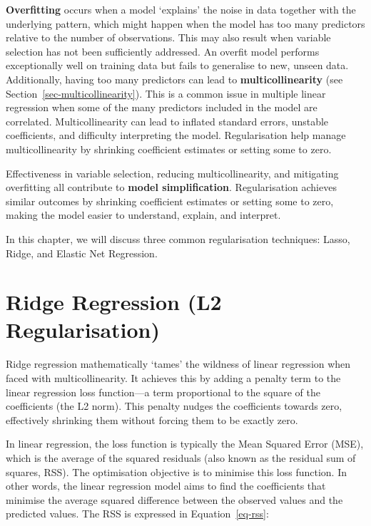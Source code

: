 \documentclass[
  letterpaper,
]{book}
\begin{document}
\textbf{Overfitting} occurs when a model `explains' the noise in data
together with the underlying pattern, which might happen when the model
has too many predictors relative to the number of observations. This may
also result when variable selection has not been sufficiently addressed.
An overfit model performs exceptionally well on training data but fails
to generalise to new, unseen data. Additionally, having too many
predictors can lead to \textbf{multicollinearity} (see
Section~\ref{sec-multicollinearity}). This is a common issue in multiple
linear regression when some of the many predictors included in the model
are correlated. Multicollinearity can lead to inflated standard errors,
unstable coefficients, and difficulty interpreting the model.
Regularisation help manage multicollinearity by shrinking coefficient
estimates or setting some to zero.

Effectiveness in variable selection, reducing multicollinearity, and
mitigating overfitting all contribute to \textbf{model simplification}.
Regularisation achieves similar outcomes by shrinking coefficient
estimates or setting some to zero, making the model easier to
understand, explain, and interpret.

In this chapter, we will discuss three common regularisation techniques:
Lasso, Ridge, and Elastic Net Regression.

\section{Ridge Regression (L2
Regularisation)}\label{ridge-regression-l2-regularisation}

Ridge regression mathematically `tames' the wildness of linear
regression when faced with multicollinearity. It achieves this by adding
a penalty term to the linear regression loss function---a term
proportional to the square of the coefficients (the L2 norm). This
penalty nudges the coefficients towards zero, effectively shrinking them
without forcing them to be exactly zero.

In linear regression, the loss function is typically the Mean Squared
Error (MSE), which is the average of the squared residuals (also known
as the residual sum of squares, RSS). The optimisation objective is to
minimise this loss function. In other words, the linear regression model
aims to find the coefficients that minimise the average squared
difference between the observed values and the predicted values. The RSS
is expressed in Equation~\ref{eq-rss}:
\end{document}
